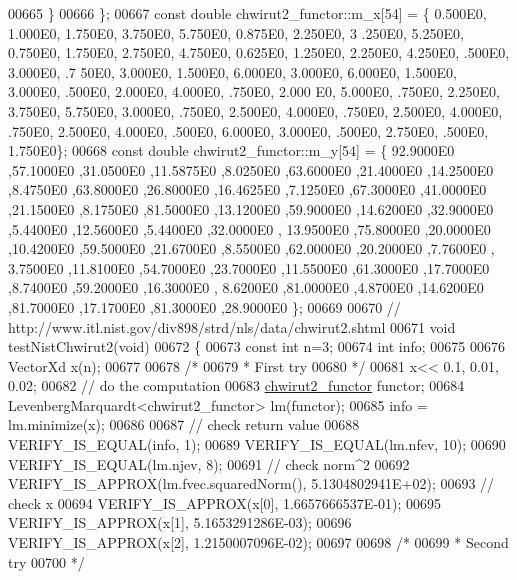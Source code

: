 \begin{DoxyCode}
00665     \}
00666 \};
00667 \textcolor{keyword}{const} \textcolor{keywordtype}{double} chwirut2\_functor::m\_x[54] = \{ 0.500E0, 1.000E0, 1.750E0, 3.750E0, 5.750E0, 0.875E0, 2.250E0, 3
      .250E0, 5.250E0, 0.750E0, 1.750E0, 2.750E0, 4.750E0, 0.625E0, 1.250E0, 2.250E0, 4.250E0, .500E0, 3.000E0, .7
      50E0, 3.000E0, 1.500E0, 6.000E0, 3.000E0, 6.000E0, 1.500E0, 3.000E0, .500E0, 2.000E0, 4.000E0, .750E0, 2.000
      E0, 5.000E0, .750E0, 2.250E0, 3.750E0, 5.750E0, 3.000E0, .750E0, 2.500E0, 4.000E0, .750E0, 2.500E0, 4.000E0,
       .750E0, 2.500E0, 4.000E0, .500E0, 6.000E0, 3.000E0, .500E0, 2.750E0, .500E0, 1.750E0\};
00668 \textcolor{keyword}{const} \textcolor{keywordtype}{double} chwirut2\_functor::m\_y[54] = \{ 92.9000E0 ,57.1000E0 ,31.0500E0 ,11.5875E0 ,8.0250E0 ,63.6000E0 
      ,21.4000E0 ,14.2500E0 ,8.4750E0 ,63.8000E0 ,26.8000E0 ,16.4625E0 ,7.1250E0 ,67.3000E0 ,41.0000E0 ,21.1500E0 
      ,8.1750E0 ,81.5000E0 ,13.1200E0 ,59.9000E0 ,14.6200E0 ,32.9000E0 ,5.4400E0 ,12.5600E0 ,5.4400E0 ,32.0000E0 ,
      13.9500E0 ,75.8000E0 ,20.0000E0 ,10.4200E0 ,59.5000E0 ,21.6700E0 ,8.5500E0 ,62.0000E0 ,20.2000E0 ,7.7600E0 ,
      3.7500E0 ,11.8100E0 ,54.7000E0 ,23.7000E0 ,11.5500E0 ,61.3000E0 ,17.7000E0 ,8.7400E0 ,59.2000E0 ,16.3000E0 ,
      8.6200E0 ,81.0000E0 ,4.8700E0 ,14.6200E0 ,81.7000E0 ,17.1700E0 ,81.3000E0 ,28.9000E0  \};
00669 
00670 \textcolor{comment}{// http://www.itl.nist.gov/div898/strd/nls/data/chwirut2.shtml}
00671 \textcolor{keywordtype}{void} testNistChwirut2(\textcolor{keywordtype}{void})
00672 \{
00673   \textcolor{keyword}{const} \textcolor{keywordtype}{int} n=3;
00674   \textcolor{keywordtype}{int} info;
00675 
00676   VectorXd x(n);
00677 
00678   \textcolor{comment}{/*}
00679 \textcolor{comment}{   * First try}
00680 \textcolor{comment}{   */}
00681   x<< 0.1, 0.01, 0.02;
00682   \textcolor{comment}{// do the computation}
00683   \hyperlink{structchwirut2__functor}{chwirut2\_functor} functor;
00684   LevenbergMarquardt<chwirut2\_functor> lm(functor);
00685   info = lm.minimize(x);
00686 
00687   \textcolor{comment}{// check return value}
00688   VERIFY\_IS\_EQUAL(info, 1);
00689   VERIFY\_IS\_EQUAL(lm.nfev, 10);
00690   VERIFY\_IS\_EQUAL(lm.njev, 8);
00691   \textcolor{comment}{// check norm^2}
00692   VERIFY\_IS\_APPROX(lm.fvec.squaredNorm(), 5.1304802941E+02);
00693   \textcolor{comment}{// check x}
00694   VERIFY\_IS\_APPROX(x[0], 1.6657666537E-01);
00695   VERIFY\_IS\_APPROX(x[1], 5.1653291286E-03);
00696   VERIFY\_IS\_APPROX(x[2], 1.2150007096E-02);
00697 
00698   \textcolor{comment}{/*}
00699 \textcolor{comment}{   * Second try}
00700 \textcolor{comment}{   */}

\end{DoxyCode}
